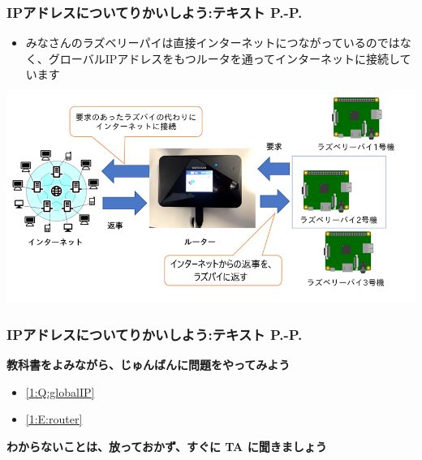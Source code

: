 \documentclass[dvipdfmx]{beamer}
\begin{document}
\begin{frame}[fragile]
	\frametitle{\large{IPアドレスについてりかいしよう:テキスト P.\pageref{1:P:IP}-P.\pageref{1:P:port}}~~~}
            \begin{itemize}
                \item みなさんのラズベリーパイは直接インターネットにつながっているのではなく、グローバルIPアドレスをもつルータを通ってインターネットに接続しています
            \end{itemize}
            \vfill
            
			\begin{minipage}{\textwidth}
                {\upshape
                  \includegraphics[width=\textwidth]{ome7-img013.png}}
            \end{minipage}
\end{frame}

\begin{frame}[fragile]
	\frametitle{\large{IPアドレスについてりかいしよう:テキスト P.\pageref{1:P:IP}-P.\pageref{1:P:port}}~~~}
      \large\textbf{教科書をよみながら、じゅんばんに問題をやってみよう}
				\begin{itemize}
					\item \ref*{1:Q:globalIP}
					\item \ref*{1:E:router} 
				\end{itemize}
      \vfill
      \large\textbf{わからないことは、放っておかず、すぐに TA に聞きましょう}
\end{frame}
\end{document}
